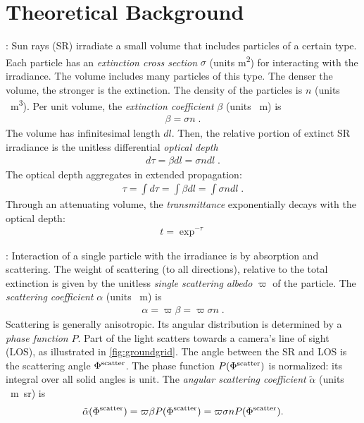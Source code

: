 \documentclass[10pt,letterpaper]{article}
\begin{document}

\section{Theoretical Background}
\label{sec:back}

: Sun rays (SR) irradiate a small volume
that includes particles of a certain type.  Each particle has an {\em
  extinction cross section} $\sigma$ (units \si{\meter\squared}) for
interacting with the irradiance. The volume includes many particles of
this type. The denser the volume, the stronger is the extinction.  The
density of the particles is $n$ (units
\si[sticky-per]{\per\cubic\metre}). Per unit volume, the {\em
  extinction coefficient} $\beta$ (units \si{\per\meter}) is
\begin{align}
  \beta= \sigma n \;.
  \label{eq:extinctc}
\end{align}
The volume has infinitesimal length $dl$. Then, the relative portion
of extinct SR irradiance is the unitless differential {\em optical
  depth}
\begin{align}
  d\tau= \beta dl=\sigma n dl \;.
  \label{eq:extinct}
\end{align}
The optical depth aggregates in extended propagation:
\begin{align}
  \tau= \int d\tau=\int \beta dl=\int \sigma n dl \;.
  \label{eq:tau}
\end{align}
Through an attenuating volume, the {\em transmittance} exponentially
decays with the optical depth:
\begin{align}
  t=\exp^{-\tau}
  \label{eq:beer-lambert}
\end{align}

: Interaction of a single particle with the
irradiance is by absorption and scattering. The weight of scattering
(to all directions), relative to the total extinction is given by the
unitless {\em single scattering albedo} $\varpi$ of the particle. The
{\em scattering coefficient} $\alpha$ (units \si{\per\meter}) is
\begin{align}
  \alpha= \varpi\beta=\varpi \sigma n \;.
  \label{eq:alph}
\end{align}
Scattering is generally anisotropic. Its angular distribution is
determined by a {\em phase function} $P$. Part of the light scatters
towards a camera's line of sight (LOS), as illustrated in
\cref{fig:groundgrid}. The angle between the SR and LOS is the
scattering angle $\Phi^{\rm scatter}$. The phase function $P(\Phi^{\rm
  scatter})$ is normalized: its integral over all solid angles is
unit. The {\em angular scattering coefficient} $\tilde\alpha$ (units
\si[sticky-per]{\per\meter\steradian}) is
\begin{align}
  \tilde\alpha(\Phi^{\rm scatter}) = \varpi\beta P(\Phi^{\rm scatter})
  = \varpi \sigma n P(\Phi^{\rm scatter}).
  \label{eq:alphabasic}
\end{align}
\end{document}

